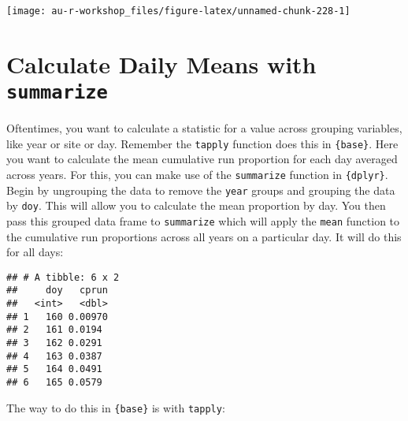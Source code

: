 \documentclass[]{book}
\newenvironment{Shaded}{\begin{snugshade}}{\end{snugshade}}
\newcommand{\KeywordTok}[1]{\textcolor[rgb]{0.13,0.29,0.53}{\textbf{#1}}}
\newcommand{\DataTypeTok}[1]{\textcolor[rgb]{0.13,0.29,0.53}{#1}}
\newcommand{\DecValTok}[1]{\textcolor[rgb]{0.00,0.00,0.81}{#1}}
\newcommand{\StringTok}[1]{\textcolor[rgb]{0.31,0.60,0.02}{#1}}
\newcommand{\OperatorTok}[1]{\textcolor[rgb]{0.81,0.36,0.00}{\textbf{#1}}}
\newcommand{\NormalTok}[1]{#1}
\theoremstyle{definition}
\theoremstyle{definition}
\theoremstyle{definition}
\theoremstyle{remark}
\begin{document}
\begin{center}\texttt{[image: au-r-workshop\_files/figure-latex/unnamed-chunk-228-1]} \end{center}

\section{\texorpdfstring{Calculate Daily Means with
\texttt{summarize}}{Calculate Daily Means with summarize}}\label{calculate-daily-means-with-summarize}

Oftentimes, you want to calculate a statistic for a value across
grouping variables, like year or site or day. Remember the
\texttt{tapply} function does this in \texttt{\{base\}}. Here you want
to calculate the mean cumulative run proportion for each day averaged
across years. For this, you can make use of the \texttt{summarize}
function in \texttt{\{dplyr\}}. Begin by ungrouping the data to remove
the \texttt{year} groups and grouping the data by \texttt{doy}. This
will allow you to calculate the mean proportion by day. You then pass
this grouped data frame to \texttt{summarize} which will apply the
\texttt{mean} function to the cumulative run proportions across all
years on a particular day. It will do this for all days:

\begin{Shaded}
\end{Shaded}

\begin{verbatim}
## # A tibble: 6 x 2
##     doy   cprun
##   <int>   <dbl>
## 1   160 0.00970
## 2   161 0.0194 
## 3   162 0.0291 
## 4   163 0.0387 
## 5   164 0.0491 
## 6   165 0.0579
\end{verbatim}

The way to do this in \texttt{\{base\}} is with \texttt{tapply}:

\begin{Shaded}
\end{Shaded}
\end{document}
